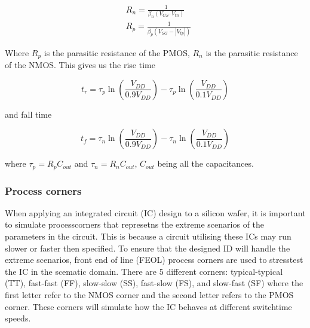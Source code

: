 \begin{equation}
    \begin{aligned}
    & R_n=\frac{1}{\beta_n\left(V_{G S^{-}} V_{t n}\right)} \\
    & R_p=\frac{1}{\beta_p\left(V_{S G}-\left|V_{t p}\right|\right)}
    \end{aligned}
    \label{eq:parasitic_resistance}
\end{equation}

Where $R_p$ is the parasitic resistance of the PMOS, $R_n$ is the parasitic resistance of the NMOS. This gives us the rise time

\begin{equation}
    t_r=\tau_p \ln \left(\frac{V_{DD}}{0.9V_{DD}}\right)-\tau_p \ln \left(\frac{V_{DD}}{0.1V_{DD}}\right)
    \label{eq:risetime}
\end{equation}

and fall time

\begin{equation}
    t_f=\tau_n \ln \left(\frac{V_{DD}}{0.9V_{DD}}\right)-\tau_n \ln \left(\frac{V_{DD}}{0.1V_{DD}}\right)
    \label{eq:falltime}
\end{equation}

where $\tau_p=R_pC_{out}$ and $\tau_n=R_nC_{out}$, $C_{out}$ being all the capacitances. \cite{departmentofelectronicsystemsntnu_2023_delay}

\subsubsection{Process corners}
When applying an integrated circuit (IC) design to a silicon wafer, it is important to simulate processcorners that represetns the extreme scenarios of the parameters in the circuit. This is because a circuit utilising these ICs may run slower or faster then specified. To ensure that the designed ID will handle the extreme scenarios,  front end of line (FEOL) process corners are used to stresstest the IC in the scematic domain. There are 5 different corners: typical-typical (TT), fast-fast (FF), slow-slow (SS), fast-slow (FS), and slow-fast (SF) where the first letter refer to the NMOS corner and the second letter refers to the PMOS corner. These corners will simulate how the IC behaves at different switchtime speeds.\cite{wikipediacontributors_2022_process}